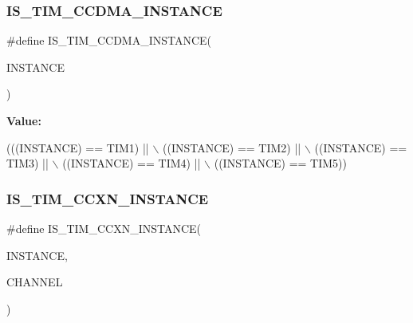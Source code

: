 \subsubsection{\texorpdfstring{I\+S\+\_\+\+T\+I\+M\+\_\+\+C\+C\+D\+M\+A\+\_\+\+I\+N\+S\+T\+A\+N\+CE}{IS\_TIM\_CCDMA\_INSTANCE}}
{\footnotesize\ttfamily \#define I\+S\+\_\+\+T\+I\+M\+\_\+\+C\+C\+D\+M\+A\+\_\+\+I\+N\+S\+T\+A\+N\+CE(\begin{DoxyParamCaption}\item[{}]{I\+N\+S\+T\+A\+N\+CE }\end{DoxyParamCaption})}

{\bfseries Value\+:}
\begin{DoxyCode}
(((INSTANCE) == TIM1) || \(\backslash\)
                                          ((INSTANCE) == TIM2) || \(\backslash\)
                                          ((INSTANCE) == TIM3) || \(\backslash\)
                                          ((INSTANCE) == TIM4) || \(\backslash\)
                                          ((INSTANCE) == TIM5))
\end{DoxyCode}
\mbox{\label{group___exported__macros_ga7181cfd1649c4e65e24b7c863e94a54f}} 
\subsubsection{\texorpdfstring{I\+S\+\_\+\+T\+I\+M\+\_\+\+C\+C\+X\+N\+\_\+\+I\+N\+S\+T\+A\+N\+CE}{IS\_TIM\_CCXN\_INSTANCE}}
{\footnotesize\ttfamily \#define I\+S\+\_\+\+T\+I\+M\+\_\+\+C\+C\+X\+N\+\_\+\+I\+N\+S\+T\+A\+N\+CE(\begin{DoxyParamCaption}\item[{}]{I\+N\+S\+T\+A\+N\+CE,  }\item[{}]{C\+H\+A\+N\+N\+EL }\end{DoxyParamCaption})}

